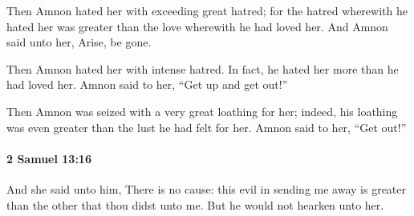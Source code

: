 			\begin{versebox}
					\item[BHS] 
					\item[ASV] Then Amnon hated her with exceeding great hatred; for the hatred wherewith he hated her was greater than the love wherewith he had loved her. And Amnon said unto her, Arise, be gone.
					\item[NIV] Then Amnon hated her with intense hatred. In fact, he hated her more than he had loved her. Amnon said to her, “Get up and get out!”
					\item[NRSV] Then Amnon was seized with a very great loathing for her; indeed, his loathing was even greater than the lust he had felt for her. Amnon said to her, “Get out!”
			\end{versebox}

		\paragraph{2 Samuel 13:16} %
			\label{2SAMUEL-13-16}

			And she said unto him, There is no cause: this evil in sending me away is greater than the other that thou didst unto me. But he would not hearken unto her.

